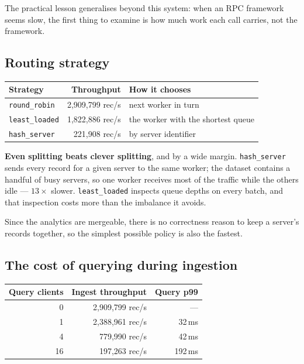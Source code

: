 \documentclass[11pt,a4paper]{article}
\begin{document}
The practical lesson generalises beyond this system: when an RPC framework seems
slow, the first thing to examine is how much work each call carries, not the
framework.

\subsection{Routing strategy}

\begin{center}\small
\begin{tabular}{@{}lrl@{}}
\toprule
\textbf{Strategy} & \textbf{Throughput} & \textbf{How it chooses} \\
\midrule
\texttt{round\_robin} & 2{,}909{,}799 rec/s & next worker in turn \\
\texttt{least\_loaded} & 1{,}822{,}886 rec/s & the worker with the shortest queue \\
\texttt{hash\_server} & \phantom{0,}221{,}908 rec/s & by server identifier \\
\bottomrule
\end{tabular}
\end{center}

\textbf{Even splitting beats clever splitting}, and by a wide margin.
\texttt{hash\_server} sends every record for a given server to the same worker;
the dataset contains a handful of busy servers, so one worker receives most of
the traffic while the others idle --- $13\times$ slower. \texttt{least\_loaded}
inspects queue depths on every batch, and that inspection costs more than the
imbalance it avoids.

Since the analytics are mergeable, there is no correctness reason to keep a
server's records together, so the simplest possible policy is also the fastest.

\subsection{The cost of querying during ingestion}

\begin{center}\small
\begin{tabular}{@{}rrr@{}}
\toprule
\textbf{Query clients} & \textbf{Ingest throughput} & \textbf{Query p99} \\
\midrule
\phantom{0}0 & 2{,}909{,}799 rec/s & --- \\
\phantom{0}1 & 2{,}388{,}961 rec/s & \phantom{0}32\,ms \\
\phantom{0}4 & \phantom{0,}779{,}990 rec/s & \phantom{0}42\,ms \\
16 & \phantom{0,}197{,}263 rec/s & 192\,ms \\
\bottomrule
\end{tabular}
\end{center}
\end{document}
